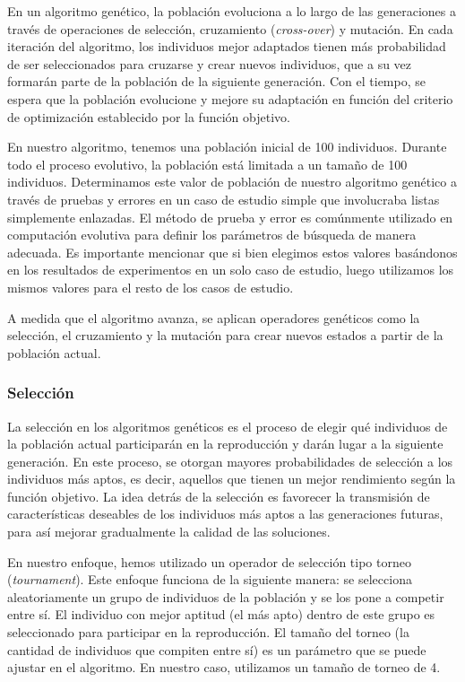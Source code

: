 En un algoritmo genético, la población evoluciona a lo largo de las generaciones a través de operaciones de selección, cruzamiento (\emph{cross-over}) y mutación. En cada iteración del algoritmo, los individuos mejor adaptados tienen más probabilidad de ser seleccionados para cruzarse y crear nuevos individuos, que a su vez formarán parte de la población de la siguiente generación. Con el tiempo, se espera que la población evolucione y mejore su adaptación en función del criterio de optimización establecido por la función objetivo.

En nuestro algoritmo, tenemos una población inicial de 100 individuos. Durante todo el proceso evolutivo, la población está limitada a un tamaño de 100 individuos. Determinamos este valor de población de nuestro algoritmo genético a través de pruebas y errores en un caso de estudio simple que involucraba listas simplemente enlazadas. El método de prueba y error es comúnmente utilizado en computación evolutiva para definir los parámetros de búsqueda de manera adecuada. Es importante mencionar que si bien elegimos estos valores basándonos en los resultados de experimentos en un solo caso de estudio, luego utilizamos los mismos valores para el resto de los casos de estudio.

A medida que el algoritmo avanza, se aplican operadores genéticos como la selección, el cruzamiento y la mutación para crear nuevos estados a partir de la población actual.

\subsubsection{Selección}

La selección en los algoritmos genéticos es el proceso de elegir qué individuos de la población actual participarán en la reproducción y darán lugar a la siguiente generación. En este proceso, se otorgan mayores probabilidades de selección a los individuos más aptos, es decir, aquellos que tienen un mejor rendimiento según la función objetivo. La idea detrás de la selección es favorecer la transmisión de características deseables de los individuos más aptos a las generaciones futuras, para así mejorar gradualmente la calidad de las soluciones.

En nuestro enfoque, hemos utilizado un operador de selección tipo torneo (\emph{tournament}). Este enfoque funciona de la siguiente manera: se selecciona aleatoriamente un grupo de individuos de la población y se los pone a competir entre sí. El individuo con mejor aptitud (el más apto) dentro de este grupo es seleccionado para participar en la reproducción. El tamaño del torneo (la cantidad de individuos que compiten entre sí) es un parámetro que se puede ajustar en el algoritmo. En nuestro caso, utilizamos un tamaño de torneo de 4.

